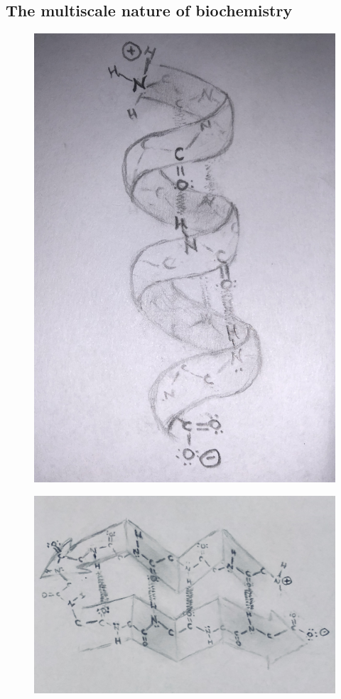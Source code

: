 \documentclass[12pt]{ucsddissertation}
\begin{document}
\begin{dissertationintroduction}
\section{The multiscale nature of biochemistry}
\setcounter{figure}{1}
\begin{figure}
    \begin{minipage}{\linewidth}
    \centering
    \captionsetup[subfigure]{justification=centering}
    \captionsetup[caption]{justification=centering}
    \includegraphics[width=0.55\linewidth]{helix0.jpg}
    \label{fig:0a}\par\vfill
    \includegraphics[width=0.8\linewidth]{sheet0.jpg}
    \label{fig:0b}

\end{minipage}
\end{figure}
\end{dissertationintroduction}
\end{document}
